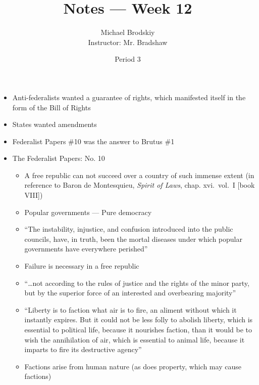 \documentclass[12pt]{article}
\title{Notes — Week 12}
\date{Period 3}
\author{Michael Brodskiy\\ \small Instructor: Mr. Bradshaw}
\begin{document}
\maketitle

\begin{itemize}

  \item Anti-federalists wanted a guarantee of rights, which manifested itself in the form of the Bill of Rights

  \item States wanted amendments

  \item Federalist Papers \#10 was the answer to Brutus \#1

  \item The Federalist Papers: No. 10

    \begin{itemize}

      \item A free republic can not succeed over a country of such immense extent (in reference to Baron de Montesquieu, \textit{Spirit of Laws}, chap. xvi.\ vol.\ I [book VIII])

      \item Popular governments — Pure democracy

      \item “The instability, injustice, and confusion introduced into the public councils, have, in truth, been the mortal diseases under which popular governments have everywhere perished”

      \item Failure is necessary in a free republic

      \item “\dots not according to the rules of justice and the rights of the minor party, but by the superior force of an interested and overbearing majority”

      \item “Liberty is to faction what air is to fire, an aliment without which it instantly expires. But it could not be less folly to abolish liberty, which is essential to political life, because it nourishes faction, than it would be to wish the annihilation of air, which is essential to animal life, because it imparts to fire its destructive agency”

      \item Factions arise from human nature (as does property, which may cause factions)


\end{itemize}
\end{itemize}
\end{document}
